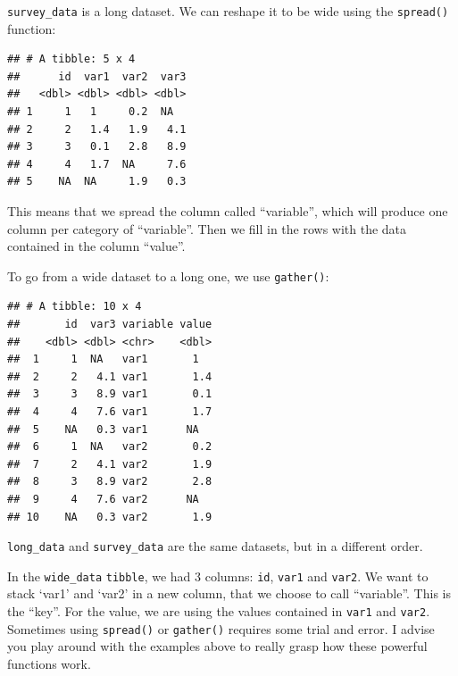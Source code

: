 \documentclass[]{gitbook}
\newenvironment{Shaded}{\begin{snugshade}}{\end{snugshade}}
\newcommand{\KeywordTok}[1]{\textcolor[rgb]{0.13,0.29,0.53}{\textbf{#1}}}
\newcommand{\NormalTok}[1]{#1}
\newcommand{\OperatorTok}[1]{\textcolor[rgb]{0.81,0.36,0.00}{\textbf{#1}}}
\newcommand{\StringTok}[1]{\textcolor[rgb]{0.31,0.60,0.02}{#1}}
\begin{document}
\texttt{survey\_data} is a long dataset. We can reshape it to be wide using the \texttt{spread()} function:

\begin{Shaded}
\end{Shaded}

\begin{verbatim}
## # A tibble: 5 x 4
##      id  var1  var2  var3
##   <dbl> <dbl> <dbl> <dbl>
## 1     1   1     0.2  NA  
## 2     2   1.4   1.9   4.1
## 3     3   0.1   2.8   8.9
## 4     4   1.7  NA     7.6
## 5    NA  NA     1.9   0.3
\end{verbatim}

This means that we spread the column called ``variable'', which will produce one column per category
of ``variable''. Then we fill in the rows with the data contained in the column ``value''.

To go from a wide dataset to a long one, we use \texttt{gather()}:

\begin{Shaded}
\end{Shaded}

\begin{verbatim}
## # A tibble: 10 x 4
##       id  var3 variable value
##    <dbl> <dbl> <chr>    <dbl>
##  1     1  NA   var1       1  
##  2     2   4.1 var1       1.4
##  3     3   8.9 var1       0.1
##  4     4   7.6 var1       1.7
##  5    NA   0.3 var1      NA  
##  6     1  NA   var2       0.2
##  7     2   4.1 var2       1.9
##  8     3   8.9 var2       2.8
##  9     4   7.6 var2      NA  
## 10    NA   0.3 var2       1.9
\end{verbatim}

\texttt{long\_data} and \texttt{survey\_data} are the same datasets, but in a different order.

In the \texttt{wide\_data} \texttt{tibble}, we had 3 columns: \texttt{id}, \texttt{var1} and \texttt{var2}. We want to stack `var1' and
`var2' in a new column, that we choose to call ``variable''. This is the ``key''. For the value, we are
using the values contained in \texttt{var1} and \texttt{var2}. Sometimes using \texttt{spread()} or \texttt{gather()} requires
some trial and error. I advise you play around with the examples above to really grasp how these
powerful functions work.
\end{document}

